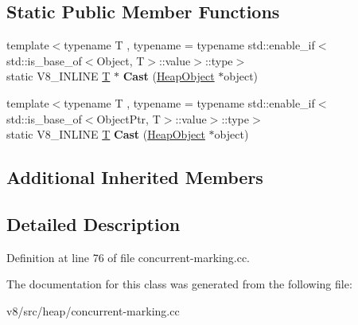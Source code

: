 \subsection*{Static Public Member Functions}
\begin{DoxyCompactItemize}
\item 
\mbox{\label{classv8_1_1internal_1_1ConcurrentMarkingVisitor_a5ccfe7b7cfca4b29d6807abe10ebcaa4}} 
{\footnotesize template$<$typename T , typename  = typename std\+::enable\+\_\+if$<$                            std\+::is\+\_\+base\+\_\+of$<$\+Object, T$>$\+::value$>$\+::type$>$ }\\static V8\+\_\+\+I\+N\+L\+I\+NE \mbox{\hyperlink{classv8_1_1internal_1_1torque_1_1T}{T}} $\ast$ {\bfseries Cast} (\mbox{\hyperlink{classv8_1_1internal_1_1HeapObject}{Heap\+Object}} $\ast$object)
\item 
\mbox{\label{classv8_1_1internal_1_1ConcurrentMarkingVisitor_a28d7654333d9bb9f9cd46747e1d94e0c}} 
{\footnotesize template$<$typename T , typename  = typename std\+::enable\+\_\+if$<$                            std\+::is\+\_\+base\+\_\+of$<$\+Object\+Ptr, T$>$\+::value$>$\+::type$>$ }\\static V8\+\_\+\+I\+N\+L\+I\+NE \mbox{\hyperlink{classv8_1_1internal_1_1torque_1_1T}{T}} {\bfseries Cast} (\mbox{\hyperlink{classv8_1_1internal_1_1HeapObject}{Heap\+Object}} $\ast$object)
\end{DoxyCompactItemize}
\subsection*{Additional Inherited Members}


\subsection{Detailed Description}


Definition at line 76 of file concurrent-\/marking.\+cc.



The documentation for this class was generated from the following file\+:\begin{DoxyCompactItemize}
\item 
v8/src/heap/concurrent-\/marking.\+cc\end{DoxyCompactItemize}
